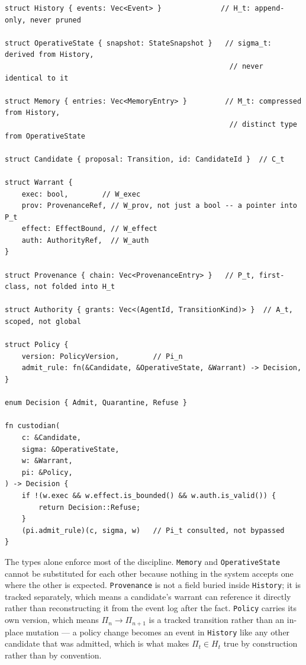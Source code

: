 \documentclass[11pt,openany]{book}
\begin{document}
\begin{lstlisting}
struct History { events: Vec<Event> }              // H_t: append-only, never pruned

struct OperativeState { snapshot: StateSnapshot }   // sigma_t: derived from History,
                                                     // never identical to it

struct Memory { entries: Vec<MemoryEntry> }         // M_t: compressed from History,
                                                     // distinct type from OperativeState

struct Candidate { proposal: Transition, id: CandidateId }  // C_t

struct Warrant {
    exec: bool,        // W_exec
    prov: ProvenanceRef, // W_prov, not just a bool -- a pointer into P_t
    effect: EffectBound, // W_effect
    auth: AuthorityRef,  // W_auth
}

struct Provenance { chain: Vec<ProvenanceEntry> }   // P_t, first-class, not folded into H_t

struct Authority { grants: Vec<(AgentId, TransitionKind)> }  // A_t, scoped, not global

struct Policy {
    version: PolicyVersion,        // Pi_n
    admit_rule: fn(&Candidate, &OperativeState, &Warrant) -> Decision,
}

enum Decision { Admit, Quarantine, Refuse }

fn custodian(
    c: &Candidate,
    sigma: &OperativeState,
    w: &Warrant,
    pi: &Policy,
) -> Decision {
    if !(w.exec && w.effect.is_bounded() && w.auth.is_valid()) {
        return Decision::Refuse;
    }
    (pi.admit_rule)(c, sigma, w)   // Pi_t consulted, not bypassed
}
\end{lstlisting}

The types alone enforce most of the discipline. \texttt{Memory} and \texttt{OperativeState} cannot be substituted for each other because nothing in the system accepts one where the other is expected. \texttt{Provenance} is not a field buried inside \texttt{History}; it is tracked separately, which means a candidate's warrant can reference it directly rather than reconstructing it from the event log after the fact. \texttt{Policy} carries its own version, which means $\Pi_n \to \Pi_{n+1}$ is a tracked transition rather than an in-place mutation — a policy change becomes an event in \texttt{History} like any other candidate that was admitted, which is what makes $\Pi_t \in H_t$ true by construction rather than by convention.
\end{document}
